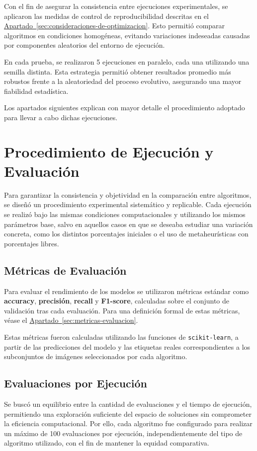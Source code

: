 Con el fin de asegurar la consistencia entre ejecuciones experimentales, se aplicaron las medidas de control de reproducibilidad
descritas en el \hyperref[sec:consideraciones-de-optimizacion]{Apartado~\ref*{sec:consideraciones-de-optimizacion}}.
Esto permitió comparar algoritmos en condiciones homogéneas, evitando variaciones indeseadas causadas por componentes aleatorios del entorno de ejecución.

En cada prueba, se realizaron 5 ejecuciones en paralelo, cada una utilizando una semilla distinta.
Esta estrategia permitió obtener resultados promedio más robustos frente a la aleatoriedad del proceso evolutivo, asegurando una mayor fiabilidad estadística.

Los apartados siguientes explican con mayor detalle el procedimiento adoptado para llevar a cabo dichas ejecuciones.


\section{Procedimiento de Ejecución y Evaluación}\label{sec:procedimiento-de-ejecucion-y-evaluacion}
Para garantizar la consistencia y objetividad en la comparación entre algoritmos, se diseñó un procedimiento experimental sistemático y replicable.
Cada ejecución se realizó bajo las mismas condiciones computacionales y utilizando los mismos parámetros base,
salvo en aquellos casos en que se deseaba estudiar una variación concreta, como los distintos porcentajes iniciales o el uso de metaheurísticas con porcentajes libres.

\subsection{Métricas de Evaluación}\label{sec:metricas-de-evaluacion}
Para evaluar el rendimiento de los modelos se utilizaron métricas estándar como \textbf{accuracy}, \textbf{precisión}, \textbf{recall} y \textbf{F1-score},
calculadas sobre el conjunto de validación tras cada evaluación.
Para una definición formal de estas métricas, véase el \hyperref[sec:metricas-evaluacion]{Apartado~\ref*{sec:metricas-evaluacion}}.

Estas métricas fueron calculadas utilizando las funciones de \texttt{scikit-learn}, a partir de las predicciones del modelo y las etiquetas
reales correspondientes a los subconjuntos de imágenes seleccionados por cada algoritmo.

\subsection{Evaluaciones por Ejecución}\label{sec:evaluaciones-por-ejecucion}
Se buscó un equilibrio entre la cantidad de evaluaciones y el tiempo de ejecución, permitiendo una exploración suficiente del espacio de soluciones sin comprometer la eficiencia computacional.
Por ello, cada algoritmo fue configurado para realizar un máximo de 100 evaluaciones por ejecución,
independientemente del tipo de algoritmo utilizado, con el fin de mantener la equidad comparativa.

